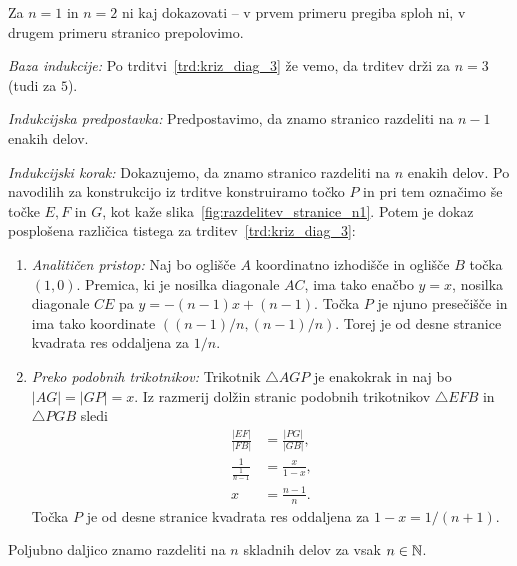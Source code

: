 \begin{dokaz}
    Za $n = 1$ in $n = 2$ ni kaj dokazovati -- v prvem primeru pregiba sploh ni, v drugem primeru stranico prepolovimo.

    \textit{Baza indukcije:} Po trditvi~\ref{trd:kriz_diag_3} že vemo, da trditev drži za $n = 3$ (tudi za $5$).

    \textit{Indukcijska predpostavka:} Predpostavimo, da znamo stranico razdeliti na $n-1$ enakih delov.

    \textit{Indukcijski korak:} Dokazujemo, da znamo stranico razdeliti na $n$ enakih delov. Po navodilih za konstrukcijo iz trditve konstruiramo točko $P$ in pri tem označimo še točke $E, F$ in $G$, kot kaže slika~\ref{fig:razdelitev_stranice_n1}. Potem je dokaz posplošena različica tistega za trditev~\ref{trd:kriz_diag_3}:
    \begin{enumerate}
        \item \textit{Analitičen pristop:} Naj bo oglišče $A$ koordinatno izhodišče in oglišče $B$ točka $(1, 0)$. Premica, ki je nosilka diagonale $AC$, ima tako enačbo $y = x$, nosilka diagonale $CE$ pa $y = -(n-1)x + (n-1)$. Točka $P$ je njuno presečišče in ima tako koordinate $((n-1)/n, (n-1)/n)$. Torej je od desne stranice kvadrata res oddaljena za $1/n$.
        \item \textit{Preko podobnih trikotnikov:} Trikotnik $\triangle AGP$ je enakokrak in naj bo $|AG| = |GP| = x$. Iz razmerij dolžin stranic podobnih trikotnikov $\triangle EFB$ in $\triangle PGB$ sledi
        \begin{align*}
            \frac{|EF|}{|FB|} &= \frac{|PG|}{|GB|}, \\
            \frac{1}{\frac{1}{n-1}} &= \frac{x}{1 - x}, \\
            x &= \frac{n-1}{n}.
        \end{align*}
        Točka $P$ je od desne stranice kvadrata res oddaljena za $1-x = 1/(n + 1)$.
    \end{enumerate}
\end{dokaz}

\begin{posledica}
    Poljubno daljico znamo razdeliti na $n$ skladnih delov za vsak $n \in \mathbb N$.
\end{posledica}

